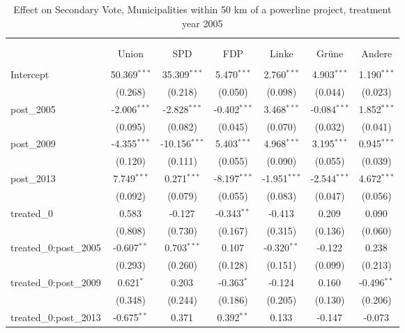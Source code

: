 \begin{table}[!htbp] \centering
  \caption{Effect on Secondary Vote, Municipalities within 50 km of a powerline project, treatment year 2005}
\begin{tabular}{@{\extracolsep{5pt}}lcccccc}
\\[-1.8ex]\hline
\hline \\[-1.8ex]
\\[-1.8ex] & \multicolumn{1}{c}{Union} & \multicolumn{1}{c}{SPD} & \multicolumn{1}{c}{FDP} & \multicolumn{1}{c}{Linke} & \multicolumn{1}{c}{Grüne} & \multicolumn{1}{c}{Andere}  \\
\hline \\[-1.8ex]
 Intercept & 50.369$^{***}$ & 35.309$^{***}$ & 5.470$^{***}$ & 2.760$^{***}$ & 4.903$^{***}$ & 1.190$^{***}$ \\
  & (0.268) & (0.218) & (0.050) & (0.098) & (0.044) & (0.023) \\
 post_2005 & -2.006$^{***}$ & -2.828$^{***}$ & -0.402$^{***}$ & 3.468$^{***}$ & -0.084$^{***}$ & 1.852$^{***}$ \\
  & (0.095) & (0.082) & (0.045) & (0.070) & (0.032) & (0.041) \\
 post_2009 & -4.355$^{***}$ & -10.156$^{***}$ & 5.403$^{***}$ & 4.968$^{***}$ & 3.195$^{***}$ & 0.945$^{***}$ \\
  & (0.120) & (0.111) & (0.055) & (0.090) & (0.055) & (0.039) \\
 post_2013 & 7.749$^{***}$ & 0.271$^{***}$ & -8.197$^{***}$ & -1.951$^{***}$ & -2.544$^{***}$ & 4.672$^{***}$ \\
  & (0.092) & (0.079) & (0.055) & (0.083) & (0.047) & (0.056) \\
 treated_0 & 0.583$^{}$ & -0.127$^{}$ & -0.343$^{**}$ & -0.413$^{}$ & 0.209$^{}$ & 0.090$^{}$ \\
  & (0.808) & (0.730) & (0.167) & (0.315) & (0.136) & (0.060) \\
 treated_0:post_2005 & -0.607$^{**}$ & 0.703$^{***}$ & 0.107$^{}$ & -0.320$^{**}$ & -0.122$^{}$ & 0.238$^{}$ \\
  & (0.293) & (0.260) & (0.128) & (0.151) & (0.099) & (0.213) \\
 treated_0:post_2009 & 0.621$^{*}$ & 0.203$^{}$ & -0.363$^{*}$ & -0.124$^{}$ & 0.160$^{}$ & -0.496$^{**}$ \\
  & (0.348) & (0.244) & (0.186) & (0.205) & (0.130) & (0.206) \\
 treated_0:post_2013 & -0.675$^{**}$ & 0.371$^{}$ & 0.392$^{**}$ & 0.133$^{}$ & -0.147$^{}$ & -0.073$^{}$ \\

\end{tabular}
\end{table}

